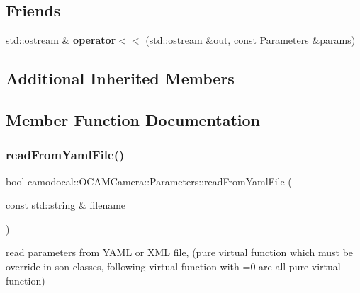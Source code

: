 \subsection*{Friends}
\begin{DoxyCompactItemize}
\item 
\mbox{\label{classcamodocal_1_1OCAMCamera_1_1Parameters_a392b64d625819770f4efedc75838cc42}} 
std\+::ostream \& {\bfseries operator$<$$<$} (std\+::ostream \&out, const \hyperlink{classcamodocal_1_1OCAMCamera_1_1Parameters}{Parameters} \&params)
\end{DoxyCompactItemize}
\subsection*{Additional Inherited Members}


\subsection{Member Function Documentation}
\mbox{\label{classcamodocal_1_1OCAMCamera_1_1Parameters_a4cf20a66d7f4e9daf84fec3a83a6c458}} 
\subsubsection{\texorpdfstring{read\+From\+Yaml\+File()}{readFromYamlFile()}}
{\footnotesize\ttfamily bool camodocal\+::\+O\+C\+A\+M\+Camera\+::\+Parameters\+::read\+From\+Yaml\+File (\begin{DoxyParamCaption}\item[{const std\+::string \&}]{filename }\end{DoxyParamCaption})\hspace{0.3cm}{\ttfamily [virtual]}}



read parameters from Y\+A\+ML or X\+ML file, (pure virtual function which must be override in son classes, following virtual function with \textquotesingle{}=0\textquotesingle{} are all pure virtual function) 


